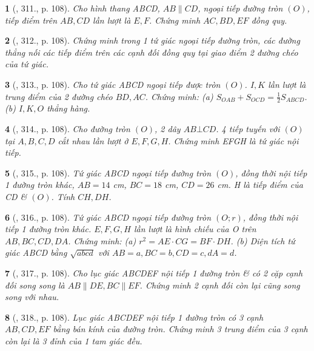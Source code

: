 \documentclass{article}
\newtheorem{baitoan}{}
\begin{document}
\begin{baitoan}[\cite{Binh_Toan_9_tap_2}, 311., p. 108]
	Cho hình thang ABCD, $AB\parallel CD$, ngoại tiếp đường tròn $(O)$, tiếp điểm trên $AB,CD$ lần lượt là $E,F$. Chứng minh $AC,BD,EF$ đồng quy.
\end{baitoan}

\begin{baitoan}[\cite{Binh_Toan_9_tap_2}, 312., p. 108]
	Chứng minh trong 1 tứ giác ngoại tiếp đường tròn, các đường thẳng nối các tiếp điểm trên các cạnh đối đồng quy tại giao điểm 2 đường chéo của tứ giác.
\end{baitoan}

\begin{baitoan}[\cite{Binh_Toan_9_tap_2}, 313., p. 108]
	Cho tứ giác ABCD ngoại tiếp được tròn $(O)$. $I,K$ lần lượt là trung điểm của 2 đường chéo $BD,AC$. Chứng minh: (a) $S_{OAB} + S_{OCD} = \frac{1}{2}S_{ABCD}$. (b) $I,K,O$ thẳng hàng.
\end{baitoan}

\begin{baitoan}[\cite{Binh_Toan_9_tap_2}, 314., p. 108]
	Cho đường tròn $(O)$, 2 dây $AB\bot CD$. 4 tiếp tuyến với $(O)$ tại $A,B,C,D$ cắt nhau lần lượt ở $E,F,G,H$. Chứng minh EFGH là tứ giác nội tiếp.
\end{baitoan}

\begin{baitoan}[\cite{Binh_Toan_9_tap_2}, 315., p. 108]
	Tứ giác ABCD ngoại tiếp đường tròn $(O)$, đồng thời nội tiếp 1 đường tròn khác, $AB = 14$ {\rm cm}, $BC = 18$ {\rm cm}, $CD = 26$ {\rm cm}. H là tiếp điểm của CD \& $(O)$. Tính $CH,DH$.
\end{baitoan}

\begin{baitoan}[\cite{Binh_Toan_9_tap_2}, 316., p. 108]
	Tứ giác ABCD ngoại tiếp đường tròn $(O;r)$, đồng thời nội tiếp 1 đường tròn khác. $E,F,G,H$ lần lượt là hình chiếu của O trên $AB,BC,CD,DA$. Chứng minh: (a) $r^2 = AE\cdot CG = BF\cdot DH$. (b) Diện tích tứ giác ABCD bằng $\sqrt{abcd}$ với $AB = a,BC = b,CD = c,dA = d$.
\end{baitoan}

\begin{baitoan}[\cite{Binh_Toan_9_tap_2}, 317., p. 108]
	Cho lục giác ABCDEF nội tiếp 1 đường tròn \& có 2 cặp cạnh đối song song là $AB\parallel DE,BC\parallel EF$. Chứng minh 2 cạnh đối còn lại cũng song song với nhau.
\end{baitoan}

\begin{baitoan}[\cite{Binh_Toan_9_tap_2}, 318., p. 108]
	Lục giác ABCDEF nội tiếp 1 đường tròn có 3 cạnh $AB,CD,EF$ bằng bán kính của đường tròn. Chứng minh 3 trung điểm của 3 cạnh còn lại là 3 đỉnh của 1 tam giác đều.
\end{baitoan}
\end{document}
